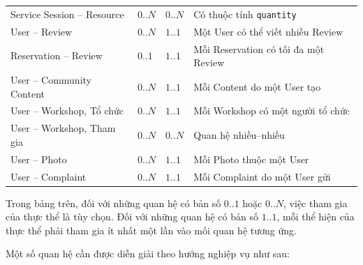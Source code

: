 \begin{center}
\begin{tabular}{p{.20\linewidth} p{.18\linewidth} p{.18\linewidth} p{.24\linewidth}}
Service Session -- Resource & $0..N$ & $0..N$ & Có thuộc tính \texttt{quantity} \\

User -- Review & $0..N$ & $1..1$ & Một User có thể viết nhiều Review \\

Reservation -- Review & $0..1$ & $1..1$ & Mỗi Reservation có tối đa một Review \\

User -- Community Content & $0..N$ & $1..1$ & Mỗi Content do một User tạo \\

User -- Workshop, Tổ chức & $0..N$ & $1..1$ & Mỗi Workshop có một người tổ chức \\

User -- Workshop, Tham gia & $0..N$ & $0..N$ & Quan hệ nhiều--nhiều \\

User -- Photo & $0..N$ & $1..1$ & Mỗi Photo thuộc một User \\

User -- Complaint & $0..N$ & $1..1$ & Mỗi Complaint do một User gửi \\

\bottomrule

\end{tabular}

\end{center}

Trong bảng trên, đối với những quan hệ có bản số $0..1$ hoặc $0..N$, việc tham gia của thực thể là tùy chọn. Đối với những quan hệ có bản số $1..1$, mỗi thể hiện của thực thể phải tham gia ít nhất một lần vào mối quan hệ tương ứng.

Một số quan hệ cần được diễn giải theo hướng nghiệp vụ như sau:

